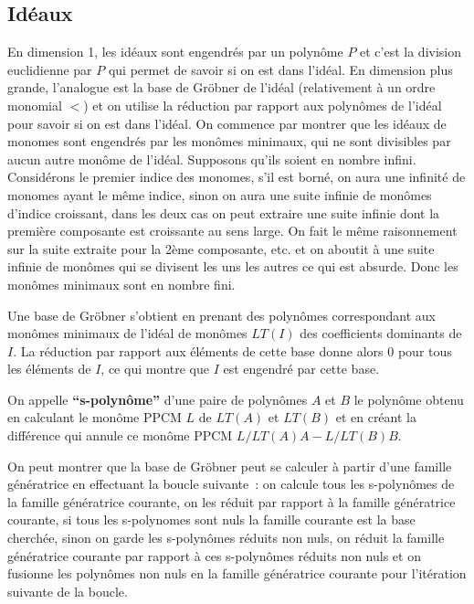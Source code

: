 \documentclass[a4paper,11pt]{article}
\begin{document}
\begin{giacjshere}
\subsection{Idéaux}
En dimension 1, les idéaux sont engendrés par un polynôme $P$ et
c'est la division euclidienne par $P$ qui permet de savoir si on est
dans l'idéal. En dimension plus grande, l'analogue est la base
de Gröbner de l'idéal (relativement à un ordre monomial $<$)
et on utilise la réduction par rapport aux polynômes de l'idéal
pour savoir si on est dans l'idéal.
On commence par montrer que les idéaux de monomes
sont engendrés par 
les monômes minimaux, qui ne sont divisibles par aucun
autre monôme de l'idéal. Supposons qu'ils soient en nombre infini.
Considérons le premier indice des monomes, s'il est borné, on 
aura une infinité de monomes ayant le même indice, sinon on
aura une suite infinie de monômes d'indice croissant, dans
les deux cas on peut extraire une suite infinie dont la première
composante est croissante au sens large. On fait le même
raisonnement sur la suite extraite pour la 2ème composante, etc.
et on aboutit à une suite infinie de monômes qui se divisent les
uns les autres ce qui est absurde. Donc les monômes minimaux
sont en nombre fini.

Une base de Gröbner s'obtient en prenant
des polynômes correspondant aux monômes minimaux 
de l'idéal de monômes $LT(I)$ 
des coefficients dominants de $I$. La réduction
par rapport aux éléments de cette base donne alors 0
pour tous les éléments de $I$, ce qui montre que
$I$ est engendré par cette base.

On appelle {\bf ``s-polynôme''} d'une paire de polynômes
$A$ et $B$
le polynôme obtenu en calculant le monôme PPCM $L$ de $LT(A)$ 
et $LT(B)$ et en créant la différence
qui annule ce monôme PPCM $L/LT(A)A -L/LT(B)B$.

On peut montrer que la base de Gröbner peut se calculer
à partir d'une famille génératrice en effectuant
la boucle suivante~:
on calcule tous les s-polynômes de la famille génératrice
courante, on les réduit par rapport à la famille génératrice
courante, si tous les s-polynomes sont nuls la famille
courante est la base cherchée, sinon 
on garde les s-polynômes réduits non nuls, on réduit
la famille génératrice courante par rapport à ces s-polynômes réduits
non nuls et on fusionne les polynômes non nuls en la famille
génératrice courante pour l'itération suivante de la boucle.


\end{giacjshere}
\end{document}
